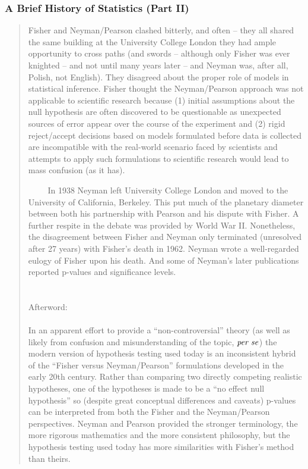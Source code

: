 \documentclass[xcolor={dvipsnames}]{beamer}
\begin{document}
\frame
{
 \frametitle{A Brief History of Statistics (Part II)}

{
\selectfont
\begin{quote}
\tiny
\justify

Fisher and Neyman/Pearson clashed bitterly, and often --  
they all shared the same building at the University College London they had ample opportunity 
to cross paths (and swords -- although only Fisher was ever knighted -- and not until many years later -- and Neyman was, after all, Polish, not English).  
They disagreed about the proper role of models in statistical inference. 
Fisher thought the Neyman/Pearson approach was not applicable to scientific research because (1) initial assumptions about the null hypothesis are often discovered to be questionable as unexpected sources of error appear over the course of the experiment and (2) rigid reject/accept decisions based on models formulated before data is collected are incompatible with the real-world scenario faced by scientists and attempts to apply such formulations to scientific research would lead to mass confusion (as it has). 

$\quad\quad$ In 1938 Neyman left University College London and moved to the University of California, Berkeley.  
This put much of the planetary diameter between both his partnership with Pearson and his dispute with Fisher.
A further respite in the debate was provided by World War II.  Nonetheless, the disagreement between Fisher and Neyman only terminated (unresolved after 27 years) with Fisher's death in 1962.  
Neyman wrote a well-regarded eulogy of Fisher upon his death.  
And some of Neyman's later publications reported p-values and significance levels.\\${}$\\${}$\\

Afterword:${}$\\${}$\\
In an apparent effort to provide a ``non-controversial'' theory (as well as likely from confusion and misunderstanding of the topic, $\textrm{\emph{per se}}$)
the modern version of hypothesis testing used today is an inconsistent hybrid of the ``Fisher versus Neyman/Pearson'' formulations developed in the early 20th century.  Rather than comparing two directly competing realistic hypotheses, one of the hypotheses is made to be a ``no effect null hypothesis'' so (despite great conceptual differences and caveats) p-values can be interpreted from both the Fisher and the Neyman/Pearson perspectives.  Neyman and Pearson provided the stronger terminology, the more rigorous mathematics and the more consistent philosophy, but the hypothesis testing used today has more similarities with Fisher's method than theirs.

\end{quote}
}
}
\end{document}
